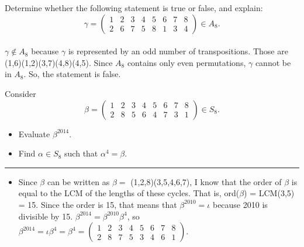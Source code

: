 \documentclass[titlepage]{article}
\newenvironment{problem}[2][Problem]{\begin{trivlist}
\item[\hskip \labelsep {\bfseries #1}\hskip \labelsep {\bfseries #2.}]}{\end{trivlist}}
\begin{document}
\begin{problem}{4}
Determine whether the following statement is true or false, and explain:
$$ \gamma = \left(\begin{array}{ccccccccc} 1 & 2 & 3 & 4 & 5 & 6 & 7 & 8  \\ 2 & 6 & 7 & 5 & 8 & 1 & 3 & 4 \end{array}\right) \in A_8.$$
\\ 
$\gamma \not\in A_8$ because $\gamma$ is represented by an odd number of transpositions. Those are (1,6)(1,2)(3,7)(4,8)(4,5). Since $A_8$ contains only even permutations, $\gamma$ cannot be in $A_8$. So, the statement is false.
\end{problem}

\begin{problem}{5}
Consider 
$$ \beta = \left(\begin{array}{ccccccccc} 1 & 2 & 3 & 4 & 5 & 6 & 7 & 8  \\ 2 & 8 & 5 & 6 & 4 & 7 & 3 & 1\end{array}\right) \in S_8.$$ 
\begin{itemize}
\item[(a)] Evaluate $\beta^{2014}$.
\item[(b)] Find $\alpha \in S_8$ such that $\alpha^4 = \beta$.
\end{itemize}
\hrule
\begin{itemize}
\item[(a)] Since $\beta$ can be written as $\beta = $ (1,2,8)(3,5,4,6,7), I know that the order of $\beta$ is equal to the LCM of the lengths of these cycles. That is, ord($\beta$) = LCM(3,5) = 15. Since the order is 15, that means that $\beta^{2010} = \iota$ because 2010 is divisible by 15. $\beta^{2014} = \beta^{2010}\beta^4$, so $\beta^{2014} = \iota \beta^4 = \beta^4 = \left(\begin{smallmatrix} 1 & 2 & 3 & 4 & 5 & 6 & 7 & 8 \\ 2 & 8 & 7 & 5 & 3 & 4 & 6 & 1 \end{smallmatrix}\right)$.


\end{itemize}
\end{problem}
\end{document}
